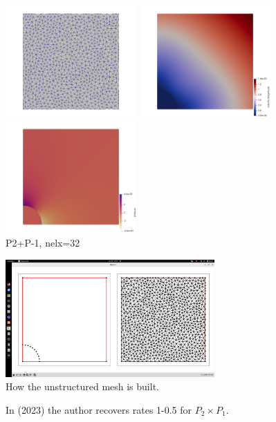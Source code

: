 \begin{center}
\includegraphics[width=5cm]{python_codes/fieldstone_120/images/solvi_mesh2}
\includegraphics[width=5cm]{python_codes/fieldstone_120/images/solvi_vel}
\includegraphics[width=5cm]{python_codes/fieldstone_120/images/solvi_press}\\
{\captionfont P2+P-1, nelx=32}
\end{center}


\begin{center}
\includegraphics[width=8cm]{python_codes/fieldstone_120/images/solvi_mesh}\\
{\captionfont How the unstructured mesh is built.}
\end{center}

In \textcite{bohm23} (2023) the author recovers rates 1-0.5 for $P_2 \times P_1$.

